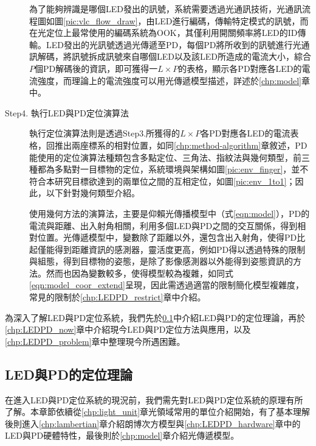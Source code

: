 \begin{description}
    \qquad
    為了能夠辨識是哪個LED發出的訊號，系統需要透過光通訊技術，光通訊流程圖如圖\ref{pic:vlc_flow_draw}，由LED進行編碼，傳輸特定模式的訊號，而在光定位上最常使用的編碼系統為OOK，其僅利用開關頻率將LED的ID傳輸。LED發出的光訊號透過光傳遞至PD，每個PD將所收到的訊號進行光通訊解碼，將訊號拆成訊號來自哪個LED以及該LED所造成的電流大小，綜合$P$個PD解碼後的資訊，即可獲得一$L\times P$的表格，顯示各PD對應各LED的電流強度，而理論上的電流強度可以用光傳遞模型描述，詳述於\ref{chp:model}章中。
    
    \item[Step4. 執行LED與PD定位演算法] \hfill
    
    \qquad
    執行定位演算法則是透過Step3.所獲得的$L\times P$各PD對應各LED的電流表格，回推出兩座標系的相對位置，如同\ref{chp:method-algorithm}章敘述，PD能使用的定位演算法種類包含多點定位、三角法、指紋法與幾何類型，前三種都為多點對一目標物的定位，系統環境與架構如圖\ref{pic:env_finger}，並不符合本研究目標欲達到的兩單位之間的互相定位，如圖\ref{pic:env_1to1}；因此，以下針對幾何類型介紹。

    \qquad
    使用幾何方法的演算法，主要是仰賴光傳播模型中（式\ref{eqn:model}），PD的電流與距離、出入射角相關，利用多個LED與PD之間的交互關係，得到相對位置。光傳遞模型中，變數除了距離以外，還包含出入射角，使得PD比起僅能得到距離資訊的感測器，靈活度更高，例如PD得以透過特殊的限制與組態，得到目標物的姿態\cite{case:orient}，是除了影像感測器以外能得到姿態資訊的方法。然而也因為變數較多，使得模型較為複雜，如同式\ref{eqn:model_coor_extend}呈現，因此需透過適當的限制簡化模型複雜度，常見的限制於\ref{chp:LEDPD_restrict}章中介紹。


\end{description}

\onehalfspacing

為深入了解LED與PD定位系統，我們先於\ref{chp:LEDPD_theorum}中介紹LED與PD的定位理論，再於\ref{chp:LEDPD_now}章中介紹現今LED與PD定位方法與應用，以及\ref{chp:LEDPD_problem}章中整理現今所遇困難。


\subsection{LED與PD的定位理論}  
\label{chp:LEDPD_theorum}

    在進入LED與PD定位系統的現況前，我們需先對LED與PD定位系統的原理有所了解。本章節依續從\ref{chp:light_unit}章光領域常用的單位介紹開始，有了基本理解後則進入\ref{chp:lambertian}章介紹朗博次方模型與\ref{chp:LEDPD_hardware}章中的LED與PD硬體特性，最後則於\ref{chp:model}章介紹光傳遞模型。

